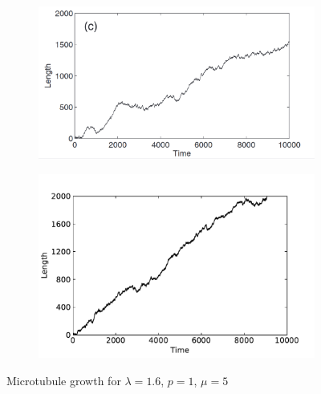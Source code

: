 \documentclass[11pt]{article}
\begin{document}
\begin{figure}[!h]
	\centering
	\begin{subfigure}{\linewidth}
		\centering
		\includegraphics[width=\linewidth]{plots/1c.png}
	\end{subfigure}
	\begin{subfigure}{\linewidth}
		\centering
		\includegraphics[width=\linewidth]{plots/1c.pdf}
	\end{subfigure}
	\caption{Microtubule growth for $\lambda=1.6$, $p=1$, $\mu=5$}
\end{figure}
\end{document}
